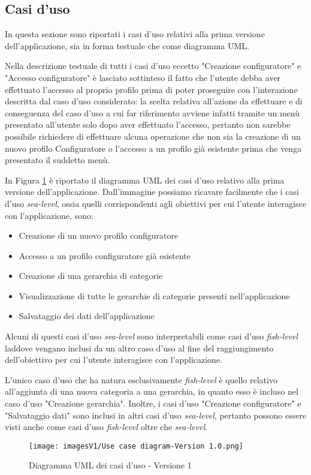\subsection{Casi d'uso}
In questa sezione sono riportati i casi d'uso relativi alla prima versione dell'applicazione, sia in forma testuale che come diagramma UML.\bigskip 

Nella descrizione testuale di tutti i casi d'uso eccetto "Creazione configuratore" e "Accesso configuratore" è lasciato sottinteso il fatto che l'utente debba aver effettuato l'accesso al proprio profilo prima di poter proseguire con l'interazione descritta dal caso d'uso considerato: la scelta relativa all'azione da effettuare e di conseguenza del caso d'uso a cui far riferimento avviene infatti tramite un menù presentato all'utente solo dopo aver effettuato l'accesso, pertanto non sarebbe possibile richiedere di effettuare alcuna operazione che non sia la creazione di un nuovo profilo Configuratore o l'accesso a un profilo già esistente prima che venga presentato il suddetto menù.\bigskip



In Figura \ref{fig:Use Case 1} è riportato il diagramma UML dei casi d'uso relativo alla prima versione dell'applicazione. Dall'immagine possiamo ricavare facilmente che i casi d'uso \textit{sea-level}, ossia quelli corrispondenti agli obiettivi per cui l'utente interagisce con l'applicazione, sono:
\begin{itemize}
    \item Creazione di un nuovo profilo configuratore 
    \item Accesso a un profilo configuratore già esistente
    \item Creazione di una gerarchia di categorie
    \item Visualizzazione di tutte le gerarchie di categorie presenti nell'applicazione
    \item Salvataggio dei dati dell'applicazione
\end{itemize}
Alcuni di questi casi d'uso \textit{sea-level} sono interpretabili come casi d'uso \textit{fish-level} laddove vengano inclusi da un altro caso d'uso al fine del raggiungimento dell'obiettivo per cui l'utente interagisce con l'applicazione.

L'unico caso d'uso che ha natura esclusivamente \textit{fish-level} è quello relativo all'aggiunta di una nuova categoria a una gerarchia, in quanto esso è incluso nel caso d'uso "Creazione gerarchia". Inoltre, i casi d'uso "Creazione configuratore" e "Salvataggio dati" sono inclusi in altri casi d'uso \textit{sea-level}, pertanto possono essere visti anche come casi d'uso \textit{fish-level} oltre che \textit{sea-level}.

\begin{figure}[hb]
\centering
\texttt{[image: imagesV1/Use case diagram-Version 1.0.png]}
\caption{\label{fig:Use Case 1}Diagramma UML dei casi d'uso - Versione 1}
\end{figure}\bigskip